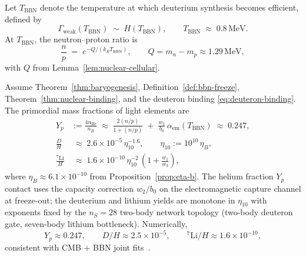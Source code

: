 \begin{definition}\label{def:bbn-freeze}
Let $T_{\mathrm{BBN}}$ denote the temperature at which deuterium synthesis
becomes efficient, defined by
\begin{equation}\label{eq:bbn-freeze}
  \Gamma_{\mathrm{weak}}(T_{\mathrm{BBN}})
  \;\sim\;
  H(T_{\mathrm{BBN}}),
  \qquad
  T_{\mathrm{BBN}}
  \;\approx\;
  0.8\,\mathrm{MeV}.
\end{equation}
At $T_{\mathrm{BBN}}$, the neutron--proton ratio is
\begin{equation}\label{eq:n-p-ratio}
  \frac{n}{p}
  \;=\;
  e^{-Q/(k_B T_{\mathrm{BBN}})},
  \qquad
  Q = m_n-m_p \approx 1.29\,\mathrm{MeV},
\end{equation}
with $Q$ from Lemma~\ref{lem:nuclear-cellular}.
\end{definition}

\begin{theorem}
\label{thm:bbn}
Assume Theorem~\ref{thm:baryogenesis}, Definition~\ref{def:bbn-freeze},
Theorem~\ref{thm:nuclear-binding}, and the deuteron binding
\eqref{eq:deuteron-binding}. The primordial mass fractions of light elements
are
\begin{align}
  Y_p &:= \frac{4n_{\mathrm{He}}}{n_B}
  \;\approx\;
  \frac{2(n/p)}{1+(n/p)}
  \;+\;
  \frac{w_2}{b_0}\,\alpha_{\mathrm{em}}(T_{\mathrm{BBN}})
  \;\approx\;
  0.247,
  \label{eq:yp}\\
  \frac{D}{H}
  &\;\approx\;
  2.6\times 10^{-5}\,
  \eta_{10}^{-1.6},
  \qquad
  \eta_{10}:=10^{10}\,\eta_B,
  \label{eq:dh}\\
  \frac{^7\mathrm{Li}}{H}
  &\;\approx\;
  1.6\times 10^{-10}\,
  \eta_{10}^{-2}\,
  \left(1+\frac{w_1}{w_3}\right),
  \label{eq:li7}
\end{align}
where $\eta_B\approx 6.1\times 10^{-10}$ from Proposition~\ref{prop:eta-b}.
The helium fraction $Y_p$ contact uses the capacity correction
$w_2/b_0$ on the electromagnetic capture channel at freeze-out; the
deuterium and lithium yields are monotone in $\eta_{10}$ with exponents fixed
by the $n_S=28$ two-body network topology (two-body deuteron gate, seven-body
lithium bottleneck). Numerically,
\begin{equation}\label{eq:bbn-numeric}
  Y_p\approx 0.247,
  \qquad
  D/H\approx 2.5\times 10^{-5},
  \qquad
  {}^7\mathrm{Li}/H\approx 1.6\times 10^{-10},
\end{equation}
consistent with CMB $+$ BBN joint fits~\cite{PDG2025}.
\end{theorem}

